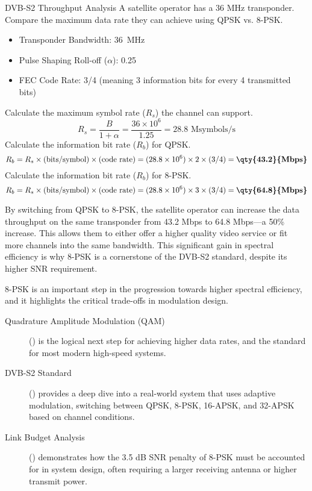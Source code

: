 \begin{workedexample}{DVB-S2 Throughput Analysis}
     A satellite operator has a 36 MHz transponder. Compare the maximum data rate they can achieve using QPSK vs. 8-PSK.
    \begin{itemize}
        \item Transponder Bandwidth: \qty{36}{MHz}
        \item Pulse Shaping Roll-off ($\alpha$): 0.25
        \item FEC Code Rate: 3/4 (meaning 3 information bits for every 4 transmitted bits)
    \end{itemize}
    \begin{derivationsteps}
        \step Calculate the maximum symbol rate ($R_s$) the channel can support.
        \[ R_s = \frac{B}{1+\alpha} = \frac{36 \times 10^6}{1.25} = 28.8 \text{ Msymbols/s} \]
        \step Calculate the information bit rate ($R_b$) for QPSK.
        \[ R_b = R_s \times (\text{bits/symbol}) \times (\text{code rate}) = (28.8 \times 10^6) \times 2 \times (3/4) = \textbf{\qty{43.2}{Mbps}} \]
        \step Calculate the information bit rate ($R_b$) for 8-PSK.
        \[ R_b = R_s \times (\text{bits/symbol}) \times (\text{code rate}) = (28.8 \times 10^6) \times 3 \times (3/4) = \textbf{\qty{64.8}{Mbps}} \]
    \end{derivationsteps}
     By switching from QPSK to 8-PSK, the satellite operator can increase the data throughput on the same transponder from 43.2 Mbps to 64.8 Mbps---a 50\% increase. This allows them to either offer a higher quality video service or fit more channels into the same bandwidth. This significant gain in spectral efficiency is why 8-PSK is a cornerstone of the DVB-S2 standard, despite its higher SNR requirement.
\end{workedexample}


\begin{importantbox}[title={Further Reading}]
    8-PSK is an important step in the progression towards higher spectral efficiency, and it highlights the critical trade-offs in modulation design.
    \begin{description}
        \item[Quadrature Amplitude Modulation (QAM)] () is the logical next step for achieving higher data rates, and the standard for most modern high-speed systems.
        \item[DVB-S2 Standard] () provides a deep dive into a real-world system that uses adaptive modulation, switching between QPSK, 8-PSK, 16-APSK, and 32-APSK based on channel conditions.
        \item[Link Budget Analysis] () demonstrates how the 3.5 dB SNR penalty of 8-PSK must be accounted for in system design, often requiring a larger receiving antenna or higher transmit power.
    \end{description}
\end{importantbox}
